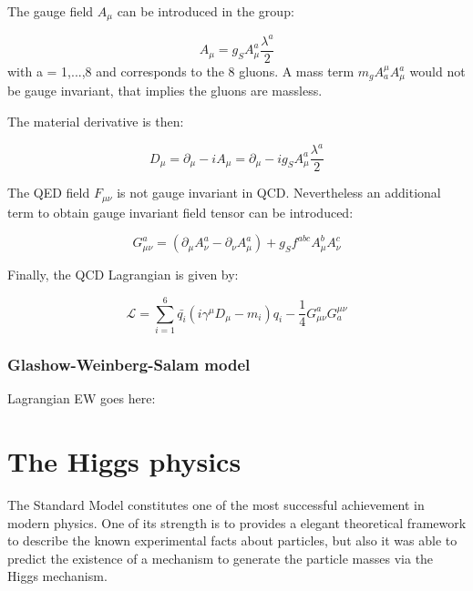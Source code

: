     The gauge field $A_{\mu}$ can be introduced in the group:
    
    \begin{equation}
        A_{\mu} = g_S A^a_{\mu}\frac{\lambda^a}{2}
    \end{equation} 
    with a = 1,...,8 and corresponds to the 8 gluons.
    A mass term  $m_g A^{\mu}_a A^a_{\mu}$ would not be gauge invariant, that implies the gluons are massless.

    The material derivative is then:

    \begin{equation}
        D_{\mu} = \partial_{\mu} - i A_{\mu} = \partial_{\mu} - i g_S A^a_{\mu} \frac{\lambda^a}{2}
    \end{equation}

    The QED field $F_{\mu \nu}$ is not gauge invariant in QCD.
    Nevertheless an additional term to obtain gauge invariant field tensor can be introduced:
    
    \begin{equation}
        G^a_{\mu \nu} = \left( \partial_{\mu} A^a_{\nu} - \partial_{\nu} A^a_{\mu} \right) + g_S f^{abc} A^b_{\mu} A^c_{\nu}
    \end{equation} 

    Finally, the QCD Lagrangian is given by:

    \begin{equation}
        \mathcal{L} = \sum_{i=1}^6  \bar{q_i} \left(i \gamma^{\mu}D_{\mu} -m_i \right)q_i - \frac{1}{4} G_{\mu \nu}^{a} G_{a}^{\mu \nu}
    \end{equation}
    
    \subsubsection{Glashow-Weinberg-Salam model}
   

    Lagrangian EW goes here: 

  \section{The Higgs physics}

    The Standard Model constitutes one of the most successful achievement in modern physics.
    One of its strength is to provides a elegant theoretical framework to describe the known experimental facts about particles, but also it was able to predict 
    the existence of a mechanism to generate the particle masses via the Higgs mechanism.

